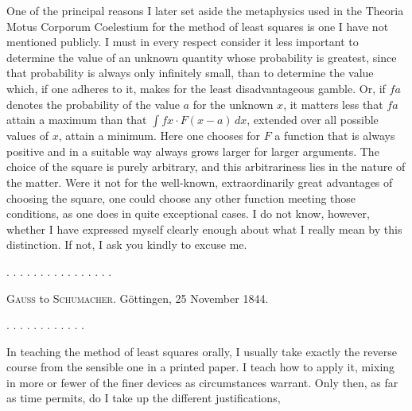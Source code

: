 One of the principal reasons I later set aside the metaphysics used in the Theoria Motus Corporum Coelestium for the method of least squares is one I have not mentioned publicly. I must in every respect consider it less important to determine the value of an unknown quantity whose probability is greatest, since that probability is always only infinitely small, than to determine the value which, if one adheres to it, makes for the least disadvantageous gamble. Or, if $fa$ denotes the probability of the value $a$ for the unknown $x$, it matters less that $fa$ attain a maximum than that $\int fx \cdot F(x-a)\,dx$, extended over all possible values of $x$, attain a minimum. Here one chooses for $F$ a function that is always positive and in a suitable way always grows larger for larger arguments. The choice of the square is purely arbitrary, and this arbitrariness lies in the nature of the matter. Were it not for the well-known, extraordinarily great advantages of choosing the square, one could choose any other function meeting those conditions, as one does in quite exceptional cases. I do not know, however, whether I have expressed myself clearly enough about what I really mean by this distinction. If not, I ask you kindly to excuse me.

. . . . . . . . . . . . . . . .

\begin{center}\textsc{Gauss} to \textsc{Schumacher}. Göttingen, 25 November 1844.\end{center}

. . . . . . . . . . . .

In teaching the method of least squares orally, I usually take exactly the reverse course from the sensible one in a printed paper. I teach  how to apply it, mixing in more or fewer of the finer devices as circumstances warrant. Only then, as far as time permits, do I take up the different justifications,
